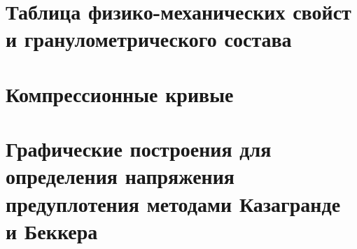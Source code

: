 \chapter{Таблица физико-механических свойст и гранулометрического состава}\label{app:tp}

\newpage

\newpage

\chapter{Компрессионные кривые}\label{app:ct}


\chapter{Графические построения для определения напряжения предуплотения методами Казагранде и Беккера}\label{app:methods}
